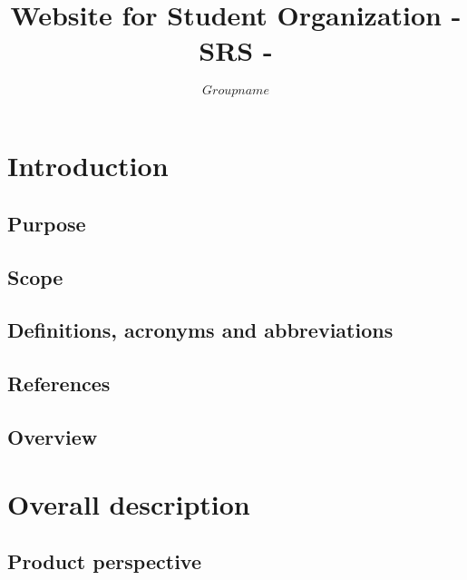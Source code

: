 \documentclass{report}
\title{
  \Huge Website for Student Organization - SRS -
}
\author{
  $$Group name$$
}
\begin{document}
  \maketitle
  \tableofcontents
  \newpage
  
  \chapter{Introduction}

  \section{Purpose}
  

  \section{Scope}
  

 \newpage
  \section{Definitions, acronyms and abbreviations}
  
  
  \section{References}
     

  \section{Overview}
  

  \newpage
  
\chapter{Overall description}
    
  \section{Product perspective}
  

  
\end{document}
